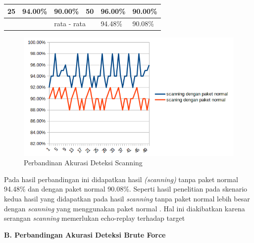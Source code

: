 \begin{table}[H]
\begin{tabular}{|l|l|l|l|l|l|}
			25 & 94.00\%                                                               & 90.00\%                                                                 & 50 & 96.00\%                                                                & 90.00\%                                                                 \\ \hline
			&                                                                       & \multicolumn{2}{l|}{rata - rata}                                             & 94.48\%                                                                & 90.08\%                                                                 \\ \hline
		\end{tabular}
	\end{table}

\begin{figure}[H]
	\centering
	\includegraphics[scale=0.8]{gambar/pscanning}
	\caption{Perbandinan Akurasi Deteksi Scanning}
	\label{Perbandinan Akurasi Deteksi Scanning}
\end{figure}

Pada hasil perbandingan ini didapatkan hasil \emph{(scanning)} tanpa paket normal 94.48\% dan dengan paket normal 90.08\%. Seperti hasil penelitian pada skenario kedua hasil yang didapatkan pada hasil \emph{scanning} tanpa paket normal lebih besar dengan \emph{scanning} yang menggunakan paket normal . Hal ini diakibatkan karena serangan \emph{scanning} memerlukan echo-replay terhadap target

\newpage
\noindent
\textbf{B. Perbandingan Akurasi Deteksi Brute Force }

